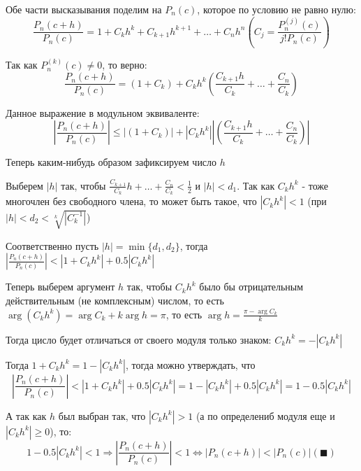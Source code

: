 \documentclass[class=article,a4paper,12pt,crop=false]{standalone}
\begin{document}
Обе части высказывания поделим на $P_n(c)$, которое по условию не равно нулю:
\begin{equation}
    \frac{P_n(c + h)}{P_n(c)} = 1 + C_kh^k + C_{k + 1}h^{k + 1} + \dots + C_nh^n (C_j = \frac{P_n^{(j)}(c)}{j!P_n(c)}) 
\end{equation}

Так как $P_n^{(k)}(c) \neq 0$, то верно:
\begin{equation}
    \frac{P_n(c + h)}{P_n(c)} = (1 + C_k) + C_kh^k(\frac{C_{k + 1}h}{C_k} + \dots + \frac{C_n}{C_k})
\end{equation}

Данное выражение в модульном эквиваленте:
\begin{equation}
    \left|\frac{P_n(c + h)}{P_n(c)}\right| \leq |(1 + C_k)| + |C_kh^k|\left|(\frac{C_{k + 1}h}{C_k} + \dots + \frac{C_n}{C_k})\right|
\end{equation}

Теперь каким-нибудь образом зафиксируем число $h$

Выберем $|h|$ так, чтобы $\frac{C_{k + 1}}{C_k}h + \dots + \frac{C_n}{C_k} < \frac{1}{2}$ и $|h| < d_1$.
Так как $C_kh^k$ - тоже многочлен без свободного члена, то может быть такое, что $|C_kh^k| < 1$
(при $|h| < d_2 < \sqrt[k]{|C_k^{-1}|}$)

Соответственно пусть $|h| = \min\{d_1, d_2\}$, тогда $\left|\frac{P_n(c + h)}{P_n(c)}\right|
< |1 + C_kh^k| + 0.5|C_kh^k|$

Теперь выберем аргумент $h$ так, чтобы $C_kh^k$ было бы отрицательным действительным (не комплексным)
числом, то есть $\arg(C_kh^k) = \arg{C_k} + k\arg{h} = \pi$, то есть $\arg{h} = \frac{\pi - \arg{C_k}}{k}$

Тогда цисло будет отличаться от своего модуля только знаком: $C_kh^k = -|C_kh^k|$

Тогда $1 + C_kh^k = 1 - |C_kh^k|$, тогда можно утверждать, что
\begin{equation}
    \left|\frac{P_n(c + h)}{P_n(c)}\right|
< |1 + C_kh^k| + 0.5|C_kh^k| = 1 - |C_kh^k| + 0.5|C_kh^k| = 1 - 0.5|C_kh^k|
\end{equation}

А так как $h$ был выбран так, что $|C_kh^k| > 1$ (а по определениб модуля еще и $|C_kh^k| \geq 0$),
то:
\begin{equation}
    1 - 0.5|C_kh^k| < 1 \Rightarrow \left|\frac{P_n(c + h)}{P_n(c)}\right| < 1 \Leftrightarrow
    |P_n(c + h)| < |P_n(c)| (\blacksquare)
\end{equation}
\end{document}
